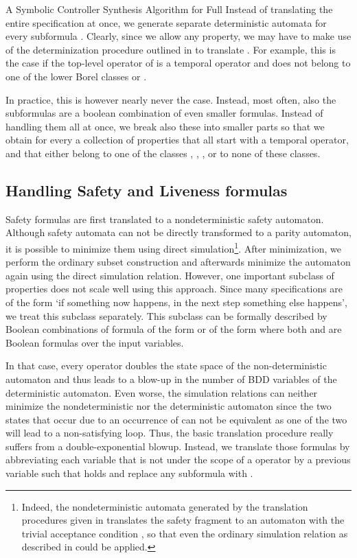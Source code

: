 \documentclass[copyright,creativecommons]{eptcs}
\begin{document}
\begin{section}{A Symbolic Controller Synthesis Algorithm for Full }
Instead of translating the entire specification at once, we generate separate deterministic automata for every subformula . Clearly, since we allow any  property, we may have to make use of the determinization procedure outlined in \cite{MoSc08} to translate . For example, this is the case if the top-level operator of  is a temporal operator and  does not belong to one of the lower Borel classes  or .

In practice, this is however nearly never the case. Instead, most often, also the subformulas  are a boolean combination of even smaller formulas. Instead of handling them all at once, we break also these into smaller parts so that we obtain for every  a collection  of  properties that all start with a temporal operator, and that either belong to one of the classes , , ,  or to none of these classes.


\subsection{Handling Safety and Liveness formulas}

Safety formulas  are first translated to a nondeterministic safety automaton. Although safety automata can not be directly transformed to a parity automaton, it is possible to minimize them using direct simulation\footnote{Indeed, the nondeterministic automata generated by the translation procedures given in \cite{Schn03} translates the safety fragment to an automaton with the trivial acceptance condition , so that even the ordinary simulation relation as described in \cite{EtWS05} could be applied.}. After minimization, we perform the ordinary subset construction and afterwards minimize the automaton again using the direct simulation relation. However, one important subclass of properties does not scale well using this approach. Since many specifications are of the form `if something now happens, in the next step something else happens', we treat this subclass separately. This subclass can be formally described by Boolean combinations of formula of the form  or of the form  where both  and  are Boolean formulas over the input variables.

In that case, every  operator doubles the state space of the non-deterministic automaton and thus leads to a blow-up in the number of BDD variables of the deterministic automaton. Even worse, the simulation relations can neither minimize the nondeterministic nor the deterministic automaton since the two states that occur due to an occurrence of  can not be equivalent as one of the two will lead to a non-satisfying loop. Thus, the basic translation procedure really suffers from a double-exponential blowup. Instead, we translate those formulas by abbreviating each variable  that is not under the scope of a  operator by a previous variable  such that  holds and replace any subformula  with .


\end{section}
\end{document}
